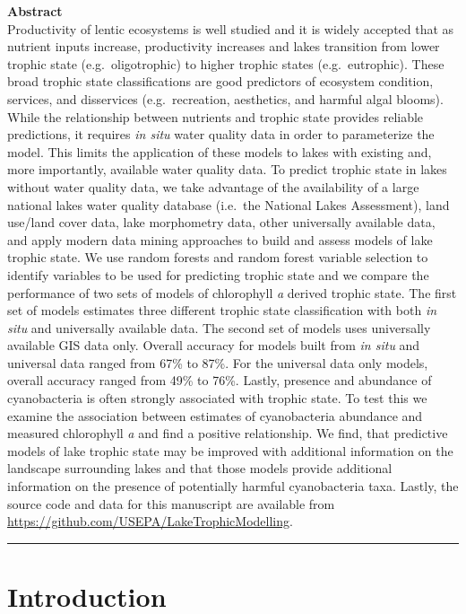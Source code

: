 \documentclass[11pt,]{article}
\begin{document}
\textbf{Abstract}\\Productivity of lentic ecosystems is well studied and
it is widely accepted that as nutrient inputs increase, productivity
increases and lakes transition from lower trophic state
(e.g.~oligotrophic) to higher trophic states (e.g.~eutrophic). These
broad trophic state classifications are good predictors of ecosystem
condition, services, and disservices (e.g.~recreation, aesthetics, and
harmful algal blooms). While the relationship between nutrients and
trophic state provides reliable predictions, it requires \emph{in situ}
water quality data in order to parameterize the model. This limits the
application of these models to lakes with existing and, more
importantly, available water quality data. To predict trophic state in
lakes without water quality data, we take advantage of the availability
of a large national lakes water quality database (i.e.~the National
Lakes Assessment), land use/land cover data, lake morphometry data,
other universally available data, and apply modern data mining
approaches to build and assess models of lake trophic state. We use
random forests and random forest variable selection to identify
variables to be used for predicting trophic state and we compare the
performance of two sets of models of chlorophyll \emph{a} derived
trophic state. The first set of models estimates three different trophic
state classification with both \emph{in situ} and universally available
data. The second set of models uses universally available GIS data only.
Overall accuracy for models built from \emph{in situ} and universal data
ranged from 67\% to 87\%. For the universal data only models, overall
accuracy ranged from 49\% to 76\%. Lastly, presence and abundance of
cyanobacteria is often strongly associated with trophic state. To test
this we examine the association between estimates of cyanobacteria
abundance and measured chlorophyll \emph{a} and find a positive
relationship. We find, that predictive models of lake trophic state may
be improved with additional information on the landscape surrounding
lakes and that those models provide additional information on the
presence of potentially harmful cyanobacteria taxa. Lastly, the source
code and data for this manuscript are available from
\url{https://github.com/USEPA/LakeTrophicModelling}.

\vspace{3mm}

\hrule

\doublespace

\section{Introduction}\label{introduction}
\end{document}
